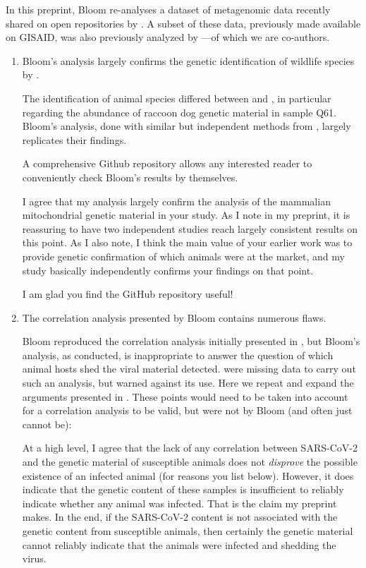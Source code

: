 \documentclass[9pt,twocolumn,twoside]{gsajnl_modified}
\begin{document}
In this preprint, Bloom re-analyses a dataset of metagenomic data recently shared on open repositories by \citet{liu2023surveillance}.
A subset of these data, previously made available on GISAID, was also previously analyzed by \citet{crits2023genetic}---of which we are co-authors.

\begin{enumerate}
\item Bloom’s analysis largely confirms the genetic identification of wildlife species by \citet{crits2023genetic}.

The identification of animal species differed between \citet{liu2023surveillance} and \citet{crits2023genetic}, in particular regarding the abundance of raccoon dog genetic material in sample Q61. Bloom’s analysis, done with similar but independent methods from \citet{crits2023genetic}, largely replicates their findings.

A comprehensive Github repository allows any interested reader to conveniently check Bloom’s results by themselves.

{\color{black}
I agree that my analysis largely confirm the analysis of the mammalian mitochondrial genetic material in your study.
As I note in my preprint, it is reassuring to have two independent studies reach largely consistent results on this point.
As I also note, I think the main value of your earlier work was to provide genetic confirmation of which animals were at the market, and my study basically independently confirms your findings on that point.

I am glad you find the GitHub repository useful!
}

\item The correlation analysis presented by Bloom contains numerous flaws.

Bloom reproduced the correlation analysis initially presented in \citet{liu2022surveillance}, but Bloom’s analysis, as conducted, is inappropriate to answer the question of which animal hosts shed the viral material detected. \citet{crits2023genetic} were missing data to carry out such an analysis, but warned against its use. Here we repeat and expand the arguments presented in \citet{crits2023genetic}. These points would need to be taken into account for a correlation analysis to be valid, but were not by Bloom (and often just cannot be):

{\color{black}
At a high level, I agree that the lack of any correlation between SARS-CoV-2 and the genetic material of susceptible animals does not \emph{disprove} the possible existence of an infected animal (for reasons you list below).
However, it does indicate that the genetic content of these samples is insufficient to reliably indicate whether any animal was infected. That is the claim my preprint makes.
In the end, if the SARS-CoV-2 content is not associated with the genetic content from susceptible animals, then certainly the genetic material cannot reliably indicate that the animals were infected and shedding the virus.

}
\end{enumerate}
\end{document}
